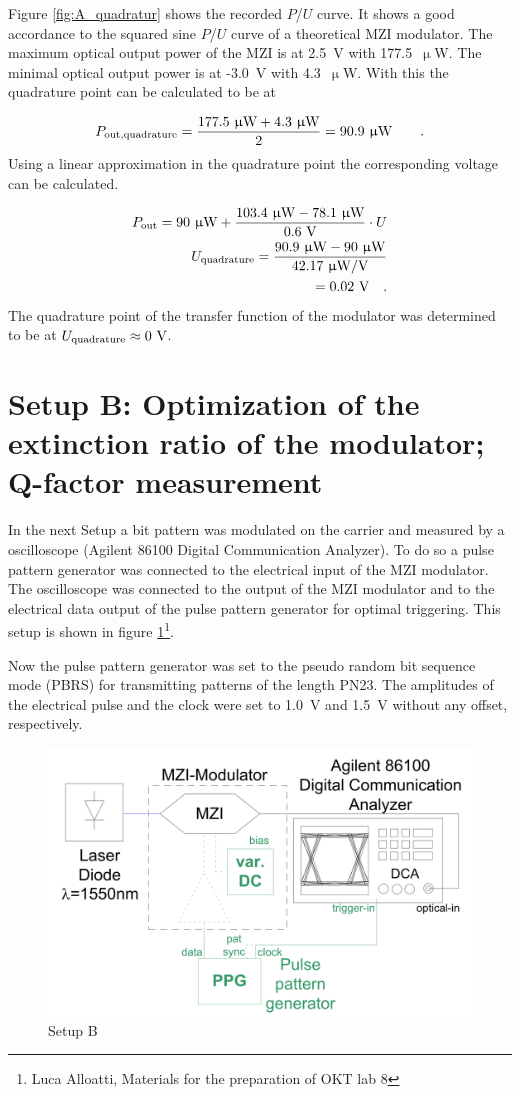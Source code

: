 Figure \ref{fig:A_quadratur} shows the recorded $P$/$U$ curve. It shows a good accordance to the squared sine $P$/$U$ curve of a theoretical MZI modulator.
The maximum optical output power of the MZI is at 2.5~V with 177.5~$\upmu$W. The minimal optical output power is at -3.0~V with 4.3~$\upmu$W. With this the quadrature point can be calculated to be at

\begin{equation}
P_{\mathrm{out,quadrature}}=\frac{177.5~\upmu \mathrm{W}+4.3~\upmu \mathrm{W}}{2}=90.9~\upmu \mathrm{W}\qquad.
\label{eq:}
\end{equation} 
Using a linear approximation in the quadrature point the corresponding voltage can be calculated.

\begin{equation}
\begin{split}
P_{\mathrm{out}}=90~\upmu \mathrm{W} + \frac{103.4~\upmu \mathrm{W}- 78.1~\upmu \mathrm{W}}{0.6~\mathrm{V}}\cdot U\\
U_{\mathrm{quadrature}}=\frac{90.9~\upmu \mathrm{W}-90~\upmu \mathrm{W}}{42.17~\upmu \mathrm{W}/\mathrm{V}}\\
=0.02~\mathrm{V} \quad.
\end{split}
\label{eq:}
\end{equation}
The quadrature point of the transfer function of the modulator was determined to be at $U_{\mathrm{quadrature}}\approx 0~\mathrm{V}$.


\section{Setup B: Optimization of the extinction ratio of the modulator; Q-factor measurement}





In the next Setup a bit pattern was modulated on the carrier and measured by a oscilloscope (Agilent 86100 Digital Communication Analyzer). To do so a pulse pattern generator was connected to the electrical input of the MZI modulator. The oscilloscope was connected to the output of the MZI modulator and to the electrical data output of the pulse pattern generator for optimal triggering. This setup is shown in figure \ref{fig:B_setup}\footnote[3]{Luca Alloatti, Materials for the preparation of OKT lab 8}.

Now the pulse pattern generator was set to the pseudo random bit sequence mode (PBRS) for transmitting patterns of the length PN23. The amplitudes of the electrical pulse and the clock were set to 1.0~V and 1.5~V without any offset, respectively.

\begin{figure}%
\centering
\includegraphics[width=.6\columnwidth]{Grafiken/B_setup.png}%
\caption{Setup B}%
\label{fig:B_setup}%
\end{figure} 